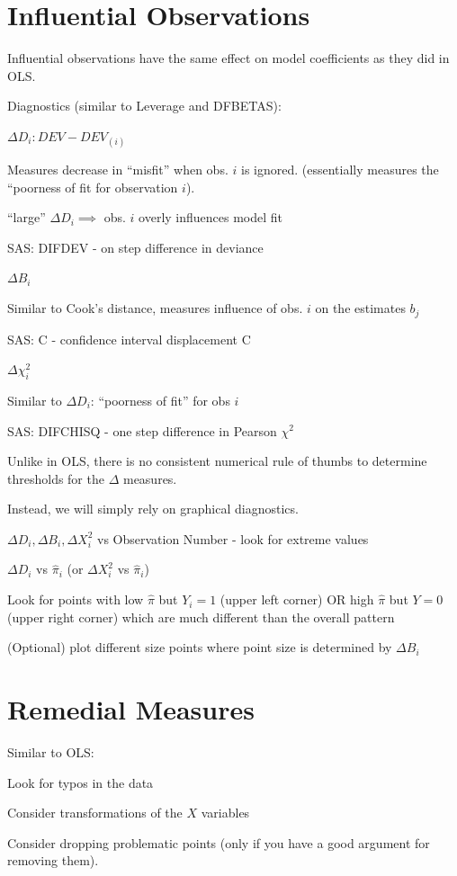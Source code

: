 \documentclass[12pt]{notes}
\begin{document}
\section{Influential Observations}
\nspace
Influential observations have the same effect on model coefficients as they did in OLS. 

\nspace
Diagnostics (similar to Leverage and DFBETAS):
\bi
\item $\Delta D_i: DEV - DEV_{(i)}$
\bi
\item Measures decrease in ``misfit'' when obs. $i$ is ignored. (essentially measures the ``poorness of fit for observation $i$). 
\item ``large'' $\Delta D_i \implies$ obs. $i$ overly influences model fit
\item SAS: DIFDEV - on step difference in deviance 
\ei
\item $\Delta B_i$
\bi
\item Similar to Cook's distance, measures influence of obs. $i$ on the estimates $b_j$
\item SAS: C - confidence interval displacement C
\ei
\item $\Delta \chi^2_i$
\bi
\item Similar to $\Delta D_i$: ``poorness of fit'' for obs $i$
\item SAS: DIFCHISQ - one step difference in Pearson $\chi^2$
\ei
\ei

\nspace 
Unlike in OLS, there is no consistent numerical rule of thumbs to determine thresholds for the $\Delta$ measures. 

\nspace
Instead, we will simply rely on graphical diagnostics. 
\bi
\item $\Delta D_i, \Delta B_i, \Delta X_i^2$ vs Observation Number - look for extreme values 
\item $\Delta D_i$ vs $\hat{\pi}_i$ (or $\Delta X_i^2$ vs $\hat{\pi}_i$)
\bi
\item Look for points with low $\hat{\pi}$ but $Y_i = 1$ (upper left corner) OR high $\hat{\pi}$ but $Y=0$ (upper right corner) which are much different than the overall pattern
\item (Optional) plot different size points where point size is determined by $\Delta B_i$
\ei
\ei

\section{Remedial Measures}
Similar to OLS:
\bi
\item Look for typos in the data
\item Consider transformations of the $X$ variables
\item Consider dropping problematic points (only if you have a good argument for removing them). 
\ei
\end{document}
